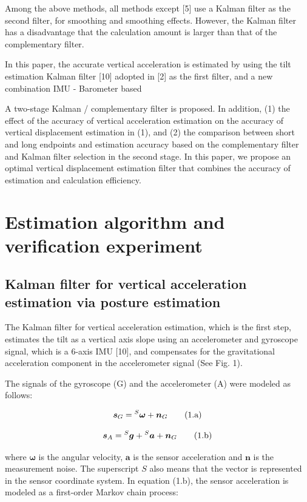 \documentclass[10pt,journal,compsoc]{IEEEtran}
\begin{document}
Among the above methods, all methods except [5] use a Kalman filter as the second filter,
for smoothing and smoothing effects.  However, the Kalman filter has a
disadvantage that the calculation amount is larger than that of the
complementary filter.

In this paper, the accurate vertical acceleration is estimated by using the
tilt estimation Kalman filter [10] adopted in [2] as the first filter, and a
new combination IMU - Barometer based

A two-stage Kalman / complementary filter is proposed. In addition, (1) the
effect of the accuracy of vertical acceleration estimation on the accuracy of
vertical displacement estimation in (1), and (2) the comparison between short
and long endpoints and estimation accuracy based on the complementary filter
and Kalman filter selection in the second stage. In this paper, we propose an
optimal vertical displacement estimation filter that combines the accuracy of
estimation and calculation efficiency.

\section{Estimation algorithm and verification experiment}

\subsection{Kalman filter for vertical acceleration estimation via posture estimation}

The Kalman filter for vertical acceleration estimation, which is the first
step, estimates the tilt as a vertical axis slope using an accelerometer and
gyroscope signal, which is a 6-axis IMU [10], and compensates for the
gravitational acceleration component in the accelerometer signal (See Fig. 1).

The signals of the gyroscope (G) and the accelerometer (A) were modeled as
follows:

\[\bm{s}_G = \prescript{S}{}{\bm{\omega}}+\bm{n}_G\tag{1.a}\]

\[\bm{s}_A = \prescript{S}{}{\bm{g}}+\prescript{S}{}{\bm{a}}+\bm{n}_G\tag{1.b}\]


\noindent where $\bm{\omega}$ is the angular velocity, $\bm{a}$ is the sensor acceleration and $\bm{n}$ is the
measurement noise. The superscript $S$ also means that the vector is represented
in the sensor coordinate system. In equation (1.b), the sensor acceleration is
modeled as a first-order Markov chain process:
\end{document}
